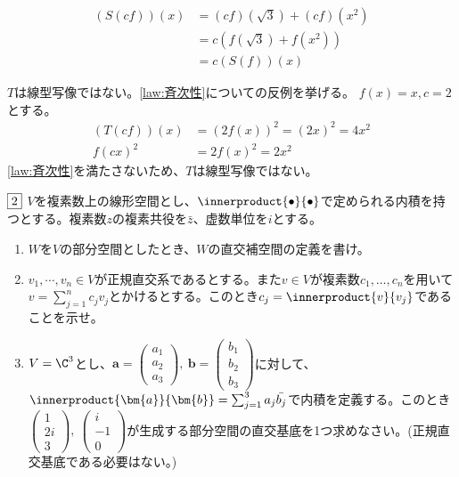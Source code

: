 \documentclass[dvipdfmx]{jsreport}
\begin{document}
\begin{souanswer}
\begin{enumerate}
\begin{enumerate_alpha}
\begin{enumerate_roman}
\begin{align*}
	(S(cf))(x)
	&= (cf)(\sqrt{3})+ (cf)(x^2)\\
	&= c(f(\sqrt{3})+ f(x^2))\\
	&= c(S(f))(x)
\end{align*}
\end{enumerate_roman}
	\item $T$は線型写像ではない。\ref{law:斉次性}についての反例を挙げる。
	$f(x)= x, c= 2$とする。
\begin{align*}
	(T(cf))(x)&= (2f(x))^2= (2x)^2= 4x^2\\
	f(cx)^2&= 2f(x)^2= 2x^2
\end{align*}
	\ref{law:斉次性}を満たさないため、$T$は線型写像ではない。
\end{enumerate_alpha}
\end{enumerate}
\end{souanswer}

\begin{tcolorbox} %
	$\fbox{2}$ $V$を複素数上の線形空間とし、$\innerproduct{\bullet}{\bullet}$で定められる内積を持つとする。複素数$z$の複素共役を$\bar{z}$、虚数単位を$i$とする。

\begin{enumerate}
	\item $W$を$V$の部分空間としたとき、$W$の直交補空間の定義を書け。
	\item $v_1, \cdots, v_n\in V$が正規直交系であるとする。また$v\in V$が複素数$c_1, \ldots, c_n$を用いて$v= \sum_{j= 1}^n c_j v_j$とかけるとする。このとき$c_j= \innerproduct{v}{v_j}$であることを示せ。
	\item $V= \C^3$とし、$\bm{a}= \begin{pmatrix}a_1\\ a_2\\ a_3\end{pmatrix},\ \bm{b}= \begin{pmatrix}b_1\\ b_2\\ b_3\end{pmatrix}$に対して、$\innerproduct{\bm{a}}{\bm{b}}= \sum_{j= 1}^3 a_j\bar{b_j}$で内積を定義する。このとき$\begin{pmatrix}1\\ 2i\\ 3\end{pmatrix},\ \begin{pmatrix}i\\ -1\\ 0\end{pmatrix}$が生成する部分空間の直交基底を1つ求めなさい。(正規直交基底である必要はない。)
\end{enumerate}
\end{tcolorbox}
\end{document}
